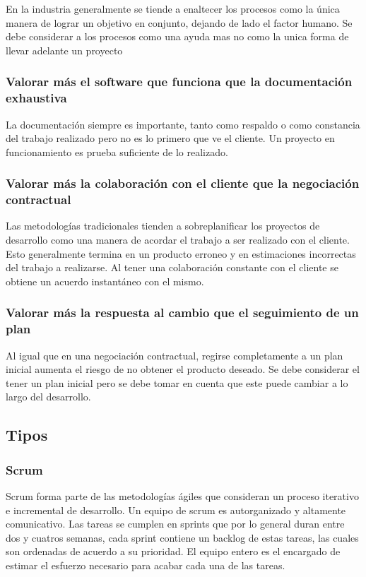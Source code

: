 En la industria generalmente se tiende a enaltecer los procesos como la única
manera de lograr un objetivo en conjunto, dejando de lado el factor humano.
Se debe considerar a los procesos como una ayuda mas no como la unica forma
de llevar adelante un proyecto

\subsubsection{Valorar más el software que funciona que la documentación exhaustiva}

La documentación siempre es importante, tanto como respaldo o como constancia
del trabajo realizado pero no es lo primero que ve el cliente. Un proyecto
en funcionamiento es prueba suficiente de lo realizado.

\subsubsection{Valorar más la colaboración con el cliente que la negociación contractual}

Las metodologías tradicionales tienden a sobreplanificar los proyectos de
desarrollo como una manera de acordar el trabajo a ser realizado con el cliente.
Esto generalmente termina en un producto erroneo y en estimaciones incorrectas
del trabajo a realizarse. Al tener una colaboración constante con el cliente
se obtiene un acuerdo instantáneo con el mismo.

\subsubsection{Valorar más la respuesta al cambio que el seguimiento de un plan}

Al igual que en una negociación contractual, regirse completamente a un
plan inicial aumenta el riesgo de no obtener el producto deseado. Se debe
considerar el tener un plan inicial pero se debe tomar en cuenta que
este puede cambiar a lo largo del desarrollo.

\subsection{Tipos}

\subsubsection{Scrum}

Scrum forma parte de las metodologías ágiles que consideran un proceso
iterativo e incremental de desarrollo. Un equipo de scrum es
autorganizado y altamente comunicativo. Las tareas se cumplen en sprints
que por lo general duran entre dos y cuatros semanas, cada sprint
contiene un backlog de estas tareas, las cuales son ordenadas de acuerdo
a su prioridad. El equipo entero es el encargado de estimar el
esfuerzo necesario para acabar cada una de las tareas.

